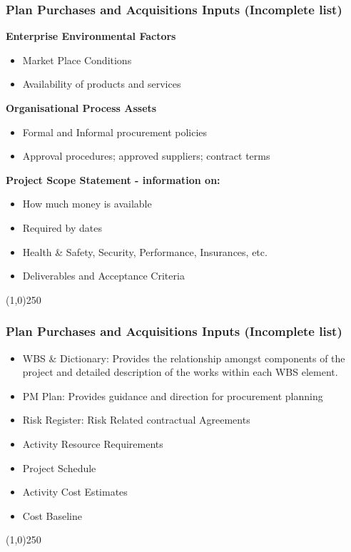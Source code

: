 \begin{frame}
\frametitle{Plan Purchases and Acquisitions \hfill\hfill Inputs (Incomplete list)}
\textbf{Enterprise Environmental Factors}
		\begin{itemize}
			\item Market Place Conditions
			\item Availability of products and services
		\end{itemize}
\textbf{Organisational Process Assets}
		\begin{itemize}
			\item Formal and Informal procurement policies
			\item Approval procedures; approved suppliers; contract terms
		\end{itemize}
\textbf{Project Scope Statement - information on:}
		\begin{itemize}
			\item How much money is available
			\item Required by dates
			\item Health \& Safety, Security, Performance, Insurances, etc.
			\item Deliverables and Acceptance Criteria
		\end{itemize}
\end{frame}\begin{center}\line(1,0){250}\end{center}


\begin{frame}
\frametitle{Plan Purchases and Acquisitions \hfill\hfill Inputs (Incomplete list)}
\begin{itemize}
 \item WBS \& Dictionary: Provides the relationship amongst components of the project and detailed description of the works within each WBS element.
 \item PM Plan: Provides guidance and direction for procurement planning
 \item Risk Register: Risk Related contractual Agreements
 \item Activity Resource Requirements
 \item Project Schedule
 \item Activity  Cost Estimates
 \item Cost Baseline
\end{itemize}
\end{frame}\begin{center}\line(1,0){250}\end{center}


